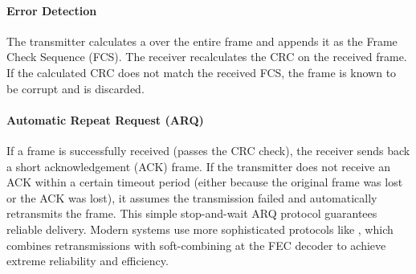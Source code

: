 \paragraph{Error Detection}
The transmitter calculates a  over the entire frame and appends it as the Frame Check Sequence (FCS). The receiver recalculates the CRC on the received frame. If the calculated CRC does not match the received FCS, the frame is known to be corrupt and is discarded.

\paragraph{Automatic Repeat Request (ARQ)}
If a frame is successfully received (passes the CRC check), the receiver sends back a short acknowledgement (ACK) frame. If the transmitter does not receive an ACK within a certain timeout period (either because the original frame was lost or the ACK was lost), it assumes the transmission failed and automatically retransmits the frame. This simple stop-and-wait ARQ protocol guarantees reliable delivery. Modern systems use more sophisticated protocols like , which combines retransmissions with soft-combining at the FEC decoder to achieve extreme reliability and efficiency.

